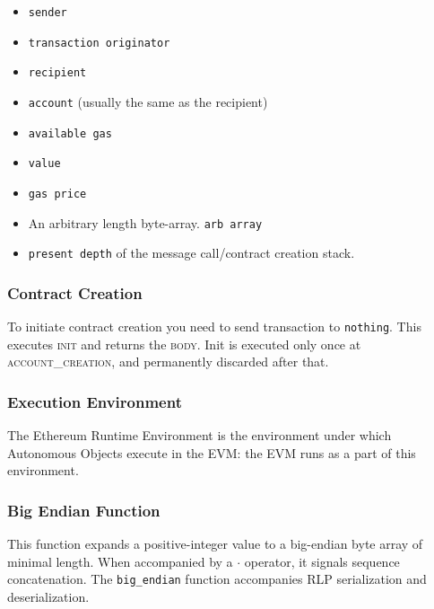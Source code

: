 \documentclass[10pt,a4paper,leqno,bibliography=totoc]{scrartcl}
\newenvironment{alphafootnotes}
{\par\edef\savedfootnotenumber{\number\value{footnote}}
\renewcommand{\thefootnote}{\alph{footnote}}
\setcounter{footnote}{0}}
{\par\setcounter{footnote}{\savedfootnotenumber}}
\begin{document}
\begin{alphafootnotes}
\begin{multicols*}{2}
\begin{itemize}
	\item \texttt{sender}
	\item \texttt{transaction originator} 
	\item \texttt{recipient}
	\item \texttt{account} (usually the same as the recipient) 
	\item \texttt{available gas} 
	\item \texttt{value}
	\item \texttt{gas price}
	\item An arbitrary length byte-array. \texttt{arb array}
	\item \texttt{present depth} of the message call/contract creation stack.
\end{itemize}


				\subsubsection{Contract Creation}
				To initiate contract creation you need to send transaction to \texttt{nothing}. This executes \textsc{init} and returns the \textsc{body}. Init is executed only once at \textsc{account\_creation}, and permanently discarded after that.		


				\subsubsection{Execution Environment}
					 The Ethereum Runtime Environment is the environment under which Autonomous Objects execute in the EVM: the EVM runs as a part of this environment.  


				\subsubsection{Big Endian Function} This function expands a positive-integer value to a big-endian byte array of minimal length. When accompanied by a $\cdot$ operator, it signals sequence concatenation. The \texttt{big\_endian} function  accompanies RLP serialization and deserialization.



\end{multicols*}
\end{alphafootnotes}
\end{document}

